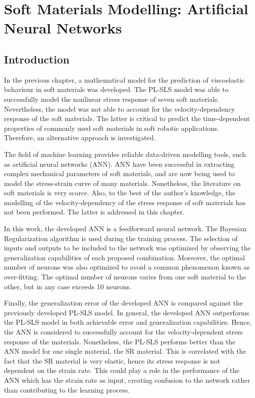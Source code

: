 \chapter{Soft Materials Modelling: Artificial Neural Networks} 
\label{ch6:ANN}

\section{Introduction} 

In the previous chapter, a mathematical model for the prediction of viscoelastic behaviour in soft materials was developed. The PL-SLS model was able to successfully model the nonlinear stress response of seven soft materials. Nevertheless, the model was not able to account for the velocity-dependency response of the soft materials. The latter is critical to predict the time-dependent properties of commonly used soft materials in soft robotic applications. Therefore, an alternative approach is investigated.

The field of machine learning provides reliable data-driven modelling tools, such as artificial neural networks (ANN). ANN have been successful in extracting complex mechanical parameters of soft materials, and are now being used to model the stress-strain curve of many materials. Nonetheless, the literature on soft materials is very scarce. Also, to the best of the author's knowledge, the modelling of the velocity-dependency of the stress response of soft materials has not been performed. The latter is addressed in this chapter.

In this work, the developed ANN is a feedforward neural network. The Bayesian Regularization algorithm is used during the training process. The selection of inputs and outputs to be included to the network was optimized by observing the generalization capabilities of each proposed combination. Moreover, the optimal number of neurons was also optimized to avoid a common phenomenon known as over-fitting. The optimal number of neurons varies from one soft material to the other, but in any case exceeds 10 neurons.

Finally, the generalization error of the developed ANN is compared against the previously developed PL-SLS model. In general, the developed ANN outperforms the PL-SLS model in both achievable error and generalization capabilities. Hence, the ANN is considered to successfully account for the velocity-dependent stress response of the materials. Nonetheless, the PL-SLS performs better than the ANN model for one single material, the SR material. This is correlated with the fact that the SR material is very elastic, hence its stress response is not dependent on the strain rate. This could play a role in the performance of the ANN which has the strain rate as input, creating confusion to the network rather than contributing to the learning process.

